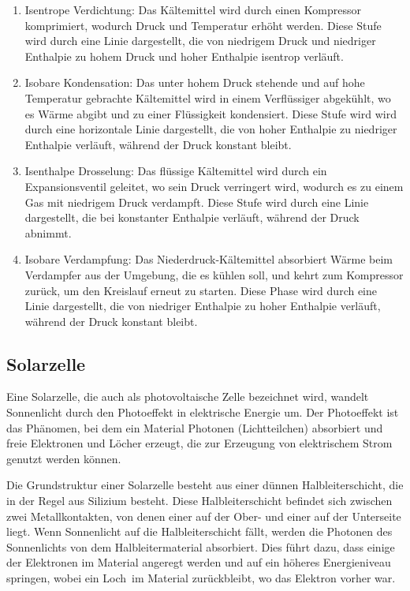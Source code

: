 \documentclass[12pt,english,ngerman]{scrartcl}
\begin{document}
\begin{enumerate}
	\item Isentrope Verdichtung: Das Kältemittel wird durch einen Kompressor komprimiert,
	      wodurch Druck und Temperatur erhöht werden. Diese
	      Stufe wird durch eine Linie dargestellt, die von niedrigem Druck und niedriger
	      Enthalpie zu hohem Druck und hoher Enthalpie isentrop verläuft.
	\item Isobare Kondensation: Das unter hohem Druck stehende und auf hohe Temperatur
	      gebrachte Kältemittel wird in einem Verflüssiger abgekühlt, wo es Wärme
	      abgibt und zu einer Flüssigkeit kondensiert. Diese Stufe wird wird durch eine
	      horizontale Linie dargestellt, die von hoher Enthalpie zu niedriger Enthalpie
	      verläuft, während der Druck konstant bleibt.
	\item Isenthalpe Drosselung: Das flüssige Kältemittel wird durch ein
	      Expansionsventil geleitet, wo sein Druck verringert wird, wodurch es zu einem
	      Gas mit niedrigem Druck verdampft. Diese Stufe wird durch eine Linie
	      dargestellt, die bei konstanter Enthalpie verläuft, während der Druck abnimmt.
	\item Isobare Verdampfung: Das Niederdruck-Kältemittel absorbiert Wärme beim
	      Verdampfer aus der Umgebung, die es kühlen soll, und kehrt zum Kompressor
	      zurück, um den Kreislauf erneut zu starten. Diese Phase wird durch eine Linie
	      dargestellt, die von niedriger Enthalpie zu hoher Enthalpie verläuft, während
	      der Druck konstant bleibt.
\end{enumerate}

\subsection{Solarzelle}
Eine Solarzelle, die auch als photovoltaische Zelle bezeichnet wird, wandelt
Sonnenlicht durch den Photoeffekt in elektrische Energie um. Der Photoeffekt
ist das Phänomen, bei dem ein Material Photonen (Lichtteilchen) absorbiert und
freie Elektronen und Löcher erzeugt, die zur Erzeugung von elektrischem Strom
genutzt werden können.

Die Grundstruktur einer Solarzelle besteht aus einer dünnen Halbleiterschicht,
die in der Regel aus Silizium besteht. Diese Halbleiterschicht befindet sich
zwischen zwei Metallkontakten, von denen einer auf der Ober- und einer auf der
Unterseite liegt. Wenn Sonnenlicht auf die Halbleiterschicht fällt, werden die
Photonen des Sonnenlichts von dem Halbleitermaterial absorbiert. Dies führt
dazu, dass einige der Elektronen im Material angeregt werden und auf ein
höheres Energieniveau springen, wobei ein \dq Loch\dq \ im Material zurückbleibt, wo
das Elektron vorher war.
\end{document}

